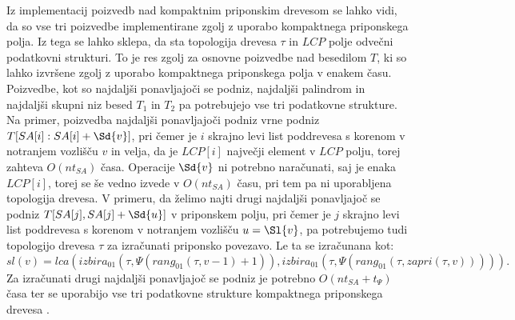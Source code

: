 Iz implementacij poizvedb nad kompaktnim priponskim drevesom se lahko vidi, da so vse tri poizvedbe implementirane zgolj z uporabo kompaktnega priponskega polja. Iz tega se lahko sklepa, da sta topologija drevesa $\tau$ in $LCP$ polje odvečni podatkovni strukturi. To je res zgolj za osnovne poizvedbe nad besedilom $T$, ki so lahko izvršene zgolj z uporabo kompaktnega priponskega polja v enakem času. Poizvedbe, kot so najdaljši ponavljajoči se podniz, najdaljši palindrom in najdaljši skupni niz besed $T_1$ in $T_2$ pa potrebujejo vse tri podatkovne strukture. Na primer, poizvedba najdaljši ponavljajoči podniz vrne podniz $T[SA[i]:SA[i]+\Sd{v}]$, pri čemer je $i$ skrajno levi list poddrevesa s korenom v notranjem vozlišču $v$ in velja, da je $LCP[i]$ največji element v $LCP$ polju, torej zahteva $O(nt_{SA})$ časa. Operacije $\Sd{v}$ ni potrebno naračunati, saj je enaka $LCP[i]$, torej se še vedno izvede v $O(nt_{SA})$ času, pri tem pa ni uporabljena topologija drevesa. V primeru, da želimo najti drugi najdaljši ponavljajoč se podniz $T[SA[j],SA[j]+\Sd{u}]$ v priponskem polju, pri čemer je $j$ skrajno levi list poddrevesa s korenom v notranjem vozlišču $u=\Sl{v}$, pa potrebujemo tudi topologijo drevesa $\tau$ za izračunati priponsko povezavo. Le ta se izračunana kot:
$$
    sl(v)=lca(izbira_{01}(\tau,\Psi(rang_{01}(\tau,v-1)+1)),izbira_{01}(\tau,\Psi(rang_{01}(\tau,zapri(\tau,v))))).
$$
Za izračunati drugi najdaljši ponavljajoč se podniz je potrebno $O(nt_{SA}+t_\Psi)$ časa ter se uporabijo vse tri podatkovne strukture kompaktnega priponskega drevesa \cite{Valimaki2007, Weiner1973, Navarro2016}.